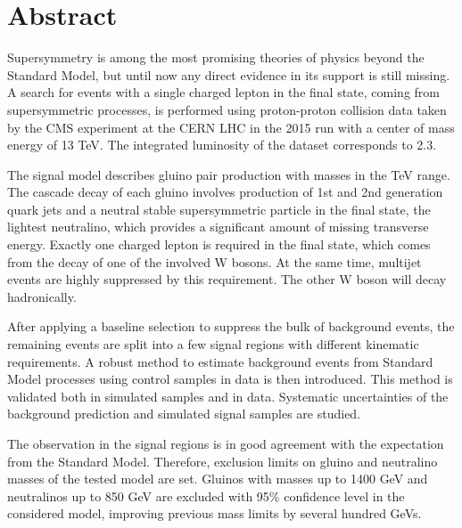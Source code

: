 \chapter*{Abstract}
Supersymmetry is among the most promising theories of physics beyond the Standard Model,
but until now any direct evidence in its support is still missing.
A search for events with a single charged lepton in the final state,
coming from supersymmetric processes, is performed using proton-proton collision data
taken by the CMS experiment at the CERN LHC in the 2015 run with a center of mass energy of 13 TeV.
The integrated luminosity of the dataset corresponds to 2.3\fbinv.%

The signal model describes gluino pair production with masses in the TeV range.
The cascade decay of each gluino involves production of 1st and 2nd generation quark jets and
a neutral stable supersymmetric particle in the final state, the lightest neutralino,
which provides a significant amount of missing transverse energy.
Exactly one charged lepton is required in the final state, which comes from the decay of one of the involved W bosons.
At the same time, multijet events are highly suppressed by this requirement.
The other W boson will decay hadronically.

After applying a baseline selection to suppress the bulk of background events, the remaining events are split into a few
signal regions with different kinematic requirements.
A robust method to estimate background events from Standard Model processes using control samples in data is then introduced.
This method is validated both in simulated samples and in data.
Systematic uncertainties of the background prediction and simulated signal samples are studied.

The observation in the signal regions is in good agreement with the expectation from the Standard Model.
Therefore, exclusion limits on gluino and neutralino masses of the tested model are set.
Gluinos with masses up to 1400 GeV and neutralinos up to 850 GeV are excluded with 95\% confidence level in the considered model,
improving previous mass limits by several hundred GeVs.

